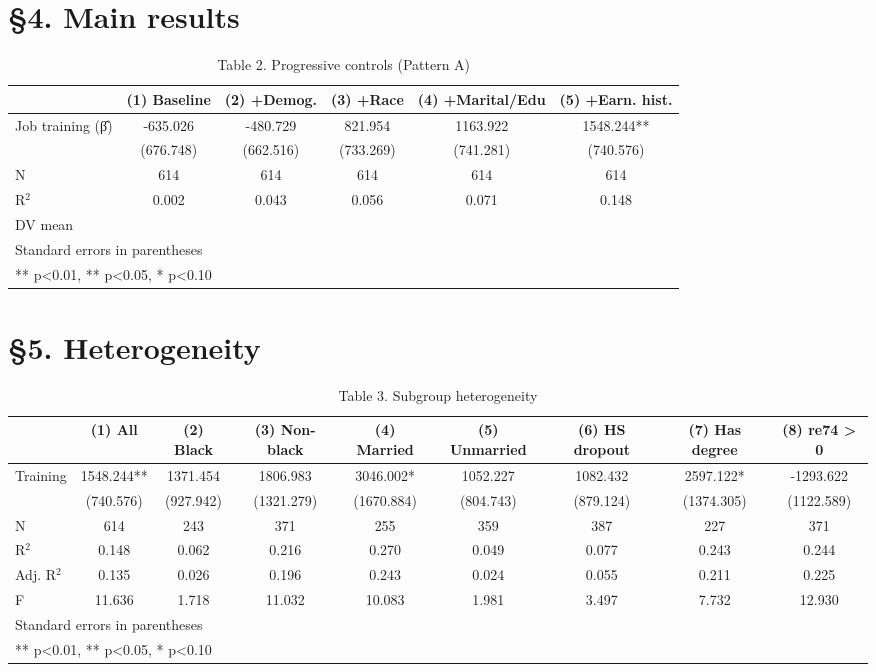 \section{§4. Main results}

\begin{table}[htbp]
\centering
\caption{Table 2. Progressive controls (Pattern A)}
\begin{tabular}{lccccc}
\hline\hline
 & (1) Baseline & (2) +Demog. & (3) +Race & (4) +Marital/Edu & (5) +Earn. hist. \\
\hline
Job training (β̂) & -635.026 & -480.729 & 821.954 & 1163.922 & 1548.244** \\
 & (676.748) & (662.516) & (733.269) & (741.281) & (740.576) \\
\hline
N & 614 & 614 & 614 & 614 & 614 \\
R$^2$ & 0.002 & 0.043 & 0.056 & 0.071 & 0.148 \\
DV mean &  &  &  &  &  \\
\hline\hline
\multicolumn{6}{l}{\footnotesize Standard errors in parentheses} \\
\multicolumn{6}{l}{\footnotesize *** p<0.01, ** p<0.05, * p<0.10} \\
\end{tabular}
\end{table}

\section{§5. Heterogeneity}

\begin{table}[htbp]
\centering
\caption{Table 3. Subgroup heterogeneity}
\begin{tabular}{lcccccccc}
\hline\hline
 & (1) All & (2) Black & (3) Non-black & (4) Married & (5) Unmarried & (6) HS dropout & (7) Has degree & (8) re74 > 0 \\
\hline
Training & 1548.244** & 1371.454 & 1806.983 & 3046.002* & 1052.227 & 1082.432 & 2597.122* & -1293.622 \\
 & (740.576) & (927.942) & (1321.279) & (1670.884) & (804.743) & (879.124) & (1374.305) & (1122.589) \\
\hline
N & 614 & 243 & 371 & 255 & 359 & 387 & 227 & 371 \\
R$^2$ & 0.148 & 0.062 & 0.216 & 0.270 & 0.049 & 0.077 & 0.243 & 0.244 \\
Adj. R$^2$ & 0.135 & 0.026 & 0.196 & 0.243 & 0.024 & 0.055 & 0.211 & 0.225 \\
F & 11.636 & 1.718 & 11.032 & 10.083 & 1.981 & 3.497 & 7.732 & 12.930 \\
\hline\hline
\multicolumn{9}{l}{\footnotesize Standard errors in parentheses} \\
\multicolumn{9}{l}{\footnotesize *** p<0.01, ** p<0.05, * p<0.10} \\
\end{tabular}
\end{table}


